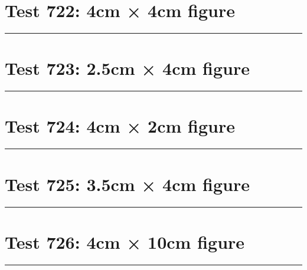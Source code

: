 \documentclass[a4paper,11pt]{article}
\begin{document}
\section*{Test 722: 4cm × 4cm figure}
\begin{swarmwrap}%
  \begin{minipage}[t]{4cm}
    \centering
    \rule{\linewidth}{4cm}
  \end{minipage}%
\end{swarmwrap}%
\swarmwrapnext
\lipsum[75]
\lipsum[76]
\lipsum[77]
\lipsum[78]
\lipsum[79]
\lipsum[80]
\section*{Test 723: 2.5cm × 4cm figure}
\begin{swarmwrap}%
  \begin{minipage}[t]{2cm}
    \centering
    \rule{\linewidth}{4cm}
  \end{minipage}%
\end{swarmwrap}%
\swarmwrapnext
\lipsum[117]
\lipsum[118]
\lipsum[119]
\lipsum[120]
\lipsum[121]
\section*{Test 724: 4cm × 2cm figure}
\begin{swarmwrap}%
  \begin{minipage}[t]{4cm}
    \centering
    \rule{\linewidth}{2cm}
  \end{minipage}%
\end{swarmwrap}%
\swarmwrapnext
\lipsum[4]
\lipsum[5]
\lipsum[6]
\lipsum[7]
\lipsum[8]
\section*{Test 725: 3.5cm × 4cm figure}
\begin{swarmwrap}%
  \begin{minipage}[t]{3cm}
    \centering
    \rule{\linewidth}{4cm}
  \end{minipage}%
\end{swarmwrap}%
\swarmwrapnext
\lipsum[100]
\lipsum[101]
\lipsum[102]
\lipsum[103]
\section*{Test 726: 4cm × 10cm figure}
\begin{swarmwrap}%
  \begin{minipage}[t]{4cm}
    \centering
    \rule{\linewidth}{10cm}
  \end{minipage}%
\end{swarmwrap}%
\swarmwrapnext
\lipsum[106]
\lipsum[107]
\lipsum[108]
\lipsum[109]
\lipsum[110]
\lipsum[111]
\end{document}
